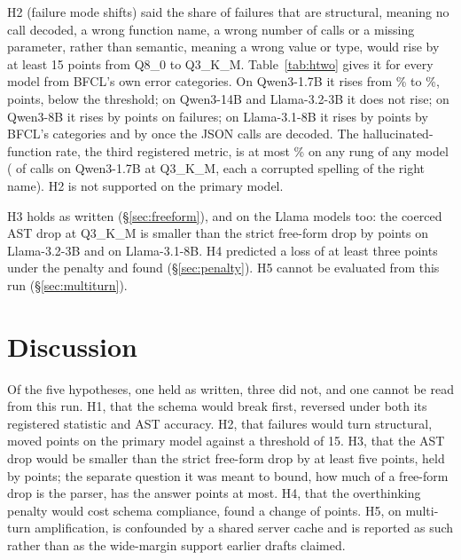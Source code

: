 \documentclass[12pt,letterpaper]{article}
\newcommand{\bfcl}{BFCL}
\newcommand{\qm}{Qwen3-1.7B}
\begin{document}
H2 (failure mode shifts) said the share of failures that are structural, meaning no call decoded, a wrong function name, a wrong number of calls or a missing parameter, rather than semantic, meaning a wrong value or type, would rise by at least 15 points from Q8\_0 to Q3\_K\_M. Table~\ref{tab:htwo} gives it for every model from \bfcl{}'s own error categories. On \qm{} it rises from \qtStructShareEight{}\% to \qtStructShareThree{}\%, \qtHtwoDelta{} points, below the threshold; on Qwen3-14B and Llama-3.2-3B it does not rise; on Qwen3-8B it rises by \qtHtwoDeltaEightB{} points on \qtFailsEightBThree{} failures; on Llama-3.1-8B it rises by \qtHtwoDeltaLlamaEightB{} points by \bfcl{}'s categories and by \qtHtwoDeltaJsonLlamaEightB{} once the \qtDecodeJsonLlamaEightBThree{} JSON calls are decoded. The hallucinated-function rate, the third registered metric, is at most \qtHallucFnThree{}\% on any rung of any model (\qtWrongNameThree{} of \qtN{} calls on \qm{} at Q3\_K\_M, each a corrupted spelling of the right name). H2 is not supported on the primary model.

H3 holds as written (\S\ref{sec:freeform}), and on the Llama models too: the coerced AST drop at Q3\_K\_M is smaller than the strict free-form drop by \qtLlamaThreeBHthreeDiff{} points on Llama-3.2-3B and \qtLlamaEightBHthreeDiff{} on Llama-3.1-8B. H4 predicted a loss of at least three points under the penalty and found \qtHfourDropThree{} (\S\ref{sec:penalty}). H5 cannot be evaluated from this run (\S\ref{sec:multiturn}).

\begin{table}[t]
\centering\footnotesize\setlength{\tabcolsep}{4pt}

\caption{H2 as written: the structural share of strict failures at Q8\_0 and Q3\_K\_M per model, from \bfcl{}'s error categories. Structural is decode failure, wrong function name, wrong call count or missing parameter; the rest are wrong values or types. The threshold was a rise of 15 points. On Llama-3.1-8B \qtDecodeJsonLlamaEightBThree{} of the \qtStructLlamaEightBThree{} structural failures at Q3\_K\_M are JSON calls the handler did not decode.}
\label{tab:htwo}
\end{table}

\section{Discussion}

Of the five hypotheses, one held as written, three did not, and one cannot be read from this run. H1, that the schema would break first, reversed under both its registered statistic and AST accuracy. H2, that failures would turn structural, moved \qtHtwoDelta{} points on the primary model against a threshold of 15. H3, that the AST drop would be smaller than the strict free-form drop by at least five points, held by \qtHthreeDiff{} points; the separate question it was meant to bound, how much of a free-form drop is the parser, has the answer \qtGsmGapMax{} points at most. H4, that the overthinking penalty would cost schema compliance, found a change of \qtHfourDropThree{} points. H5, on multi-turn amplification, is confounded by a shared server cache and is reported as such rather than as the wide-margin support earlier drafts claimed.
\end{document}
